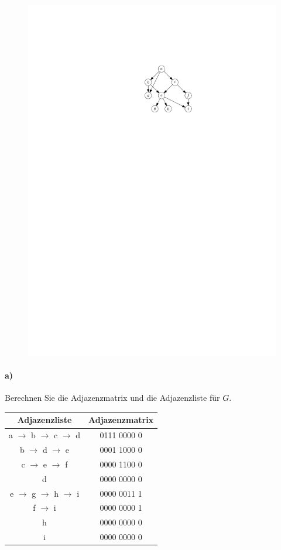 \documentclass[paper=a4, fontsize=11pt]{scrartcl}
\numberwithin{equation}{section}
\numberwithin{figure}{section}
\numberwithin{table}{section}
\begin{document}
\begin{figure}[h]
	\centering
	\includegraphics[scale=0.9]{graph}
\end{figure}

\paragraph{a)}
Berechnen Sie die Adjazenzmatrix und die Adjazenzliste für $G$. \\

\begin{tabular}{|c|c|}
\hline
Adjazenzliste & Adjazenzmatrix \\\hline
a $\rightarrow$ b $\rightarrow$ c $\rightarrow$ d & 0111 0000 0 \\\hline
b $\rightarrow$ d $\rightarrow$ e                & 0001 1000 0\\\hline
c $\rightarrow$ e $\rightarrow$ f                & 0000 1100 0\\\hline
d                                              & 0000 0000 0\\\hline
e $\rightarrow$ g $\rightarrow$ h $\rightarrow$ i & 0000 0011 1\\\hline
f $\rightarrow$ i                               & 0000 0000 1\\\hline
h                                              & 0000 0000 0\\\hline
i                                              & 0000 0000 0\\\hline
\end{tabular}
\end{document}
